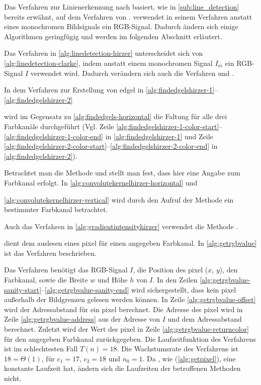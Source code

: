 Das Verfahren zur Linienerkennung nach \citeauthor{hirzer08} basiert, wie in \autoref{sub:line_detection} bereits
 erwähnt, auf dem Verfahren von \citeauthor{clarke96}. \citeauthor{hirzer08} verwendet in seinem Verfahren anstatt
 eines monochromen Bildsignals ein RGB-Signal. Dadurch ändern sich einige Algorithmen geringfügig und werden im
 folgenden Abschnitt erläutert.

Das Verfahren in \autoref{alg:linedetection-hirzer} unterscheidet sich von \autoref{alg:linedetection-clarke}, indem
 anstatt einem monochromen Signal $I_m$ ein RGB-Signal $I$ verwendet wird. Dadurch verändern sich auch die Verfahren
  und .

In dem Verfahren zur Erstellung von \gls{edgel} in \autoref{alg:findedgelshirzer-1}--\autoref{alg:findedgelshirzer-2}

wird im Gegensatz zu \autoref{alg:findedgels-horizontal} die Faltung für alle drei Farbkanäle durchgeführt (Vgl. Zeile
 \ref{alg:findedgelshirzer-1-color-start}--\ref{alg:findedgelshirzer-1-color-end} in \autoref{alg:findedgelshirzer-1}
 und Zeile \ref{alg:findedgelshirzer-2-color-start}--\ref{alg:findedgelshirzer-2-color-end} in
 \autoref{alg:findedgelshirzer-2}).

Betrachtet man die Methode  und  stellt man fest, dass hier eine
 Angabe zum Farbkanal erfolgt. In \autoref{alg:convolutekernelhirzer-horizontal} und

 \autoref{alg:convolutekernelhirzer-vertical} wird durch den Aufruf der Methode  ein bestimmter
 Farbkanal betrachtet.

Auch das Verfahren  in \autoref{alg:gradientintensityhirzer} verwendet die Methode
 .


 dient dem auslesen eines \gls{pixel} für einen angegeben Farbkanal. In \autoref{alg:getrgbvalue} ist das Verfahren beschrieben.

Das Verfahren benötigt das RGB-Signal $I$, die Position des \gls{pixel} ($x$, $y$), den Farbkanal, sowie die Breite $w$
 und Höhe $h$ von $I$. In den Zeilen \ref{alg:getrgbvalue-sanity-start}--\ref{alg:getrgbvalue-sanity-end} wird
 sichergestellt, dass kein \gls{pixel} außerhalb der Bildgrenzen gelesen werden können. In Zeile
 \ref{alg:getrgbvalue-offset} wird der Adressabstand für ein \gls{pixel} berechnet. Die Adresse des \gls{pixel} wird in
 Zeile \ref{alg:getrgbvalue-address} aus der Adresse von $I$ und dem Adressabstand berechnet. Zuletzt wird der Wert des
 \gls{pixel} in Zeile \ref{alg:getrgbvalue-returncolor} für den angegeben Farbkanal zurückgegeben. Die Laufzeitfunktion
 des Verfahrens ist im schlechtesten Fall $T(n) = 18$. Die Wachstumsrate des Verfahrens ist $18 = \Theta(1)$, für
 $c_{1} = 17$, $c_{2} = 18$ und $n_{0} = 1$. Da , wie 
 (\autoref{alg:getpixel}), eine konstante Laufzeit hat, ändern sich die Laufzeiten der betroffenen Methoden nicht.

